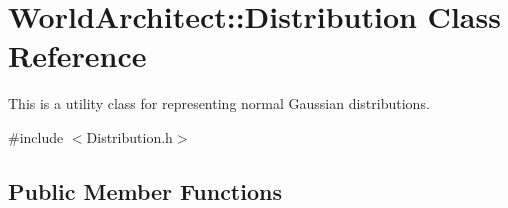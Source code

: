\hypertarget{class_world_architect_1_1_distribution}{}\section{World\+Architect\+::Distribution Class Reference}
\label{class_world_architect_1_1_distribution}


This is a utility class for representing normal Gaussian distributions.  




{\ttfamily \#include $<$Distribution.\+h$>$}

\subsection*{Public Member Functions}
